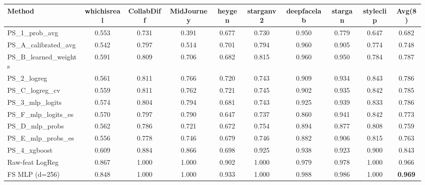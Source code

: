 \begin{tabular}{lccccccccc}
\toprule
Method & whichisreal & CollabDiff & MidJourney & heygen & starganv2 & deepfacelab & stargan & styleclip & Avg(8) \\
\midrule
PS\_1\_prob\_avg & 0.553 & 0.731 & 0.391 & 0.677 & 0.730 & 0.950 & 0.779 & 0.647 & 0.682 \\
PS\_A\_calibrated\_avg & 0.542 & 0.797 & 0.514 & 0.701 & 0.794 & 0.960 & 0.905 & 0.774 & 0.748 \\
PS\_B\_learned\_weights & 0.591 & 0.809 & 0.706 & 0.682 & 0.815 & 0.960 & 0.950 & 0.784 & 0.787 \\
PS\_2\_logreg & 0.561 & 0.811 & 0.766 & 0.720 & 0.743 & 0.909 & 0.934 & 0.843 & 0.786 \\
PS\_C\_logreg\_cv & 0.559 & 0.811 & 0.762 & 0.721 & 0.745 & 0.902 & 0.935 & 0.842 & 0.785 \\
PS\_3\_mlp\_logits & 0.574 & 0.804 & 0.794 & 0.681 & 0.743 & 0.925 & 0.939 & 0.833 & 0.786 \\
PS\_F\_mlp\_logits\_es & 0.570 & 0.797 & 0.790 & 0.647 & 0.737 & 0.860 & 0.941 & 0.842 & 0.773 \\
PS\_D\_mlp\_probs & 0.562 & 0.786 & 0.721 & 0.672 & 0.754 & 0.894 & 0.877 & 0.808 & 0.759 \\
PS\_E\_mlp\_probs\_es & 0.556 & 0.778 & 0.746 & 0.679 & 0.746 & 0.882 & 0.906 & 0.815 & 0.763 \\
PS\_4\_xgboost & 0.609 & 0.884 & 0.866 & 0.698 & 0.925 & 0.938 & 0.923 & 0.900 & 0.843 \\
\midrule
Raw-feat LogReg & 0.867 & 1.000 & 1.000 & 0.902 & 1.000 & 0.979 & 0.978 & 1.000 & 0.966 \\
FS MLP (d=256) & 0.848 & 1.000 & 1.000 & 0.933 & 1.000 & 0.988 & 0.986 & 1.000 & \textbf{0.969} \\
\bottomrule
\end{tabular}